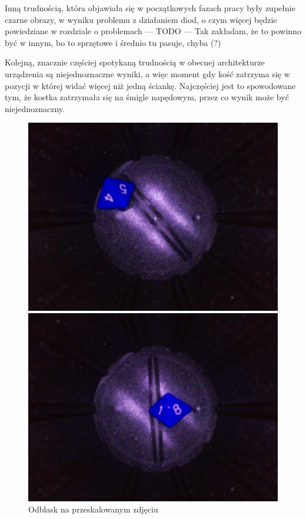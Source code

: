 Inną trudnością, która objawiała się w początkowych fazach pracy były zupełnie czarne obrazy,
w wyniku problemu z działaniem diod, o czym więcej będzie powiedziane w rozdziale o problemach
--- TODO --- Tak zakładam, że to powinno być w innym, bo to sprzętowe i średnio tu pasuje, chyba (?)

Kolejną, znacznie częściej spotykaną trudnością w obecnej architekturze urządzenia są niejednoznaczne wyniki,
a więc moment gdy kość zatrzyma się w pozycji w której widać więcej niż jedną ściankę.
Najczęściej jest to spowodowane tym, że kostka zatrzymała się na śmigle napędowym, przez co wynik może być niejednoznaczny.

\begin{figure}[H]
    \centering
    \begin{minipage}[t]{0.45\linewidth}
        \centering
        \includegraphics[width=\linewidth]{chapters/04-czytanie/figures/niepewne}
        \caption{Odblask na przeskalowanym zdjęciu}
        \label{fig:niepewne}
    \end{minipage}
    \hfill
    \begin{minipage}[t]{0.45\linewidth}
        \centering
        \includegraphics[width=\linewidth]{chapters/04-czytanie/figures/smiglo}

\end{minipage}
\end{figure}

